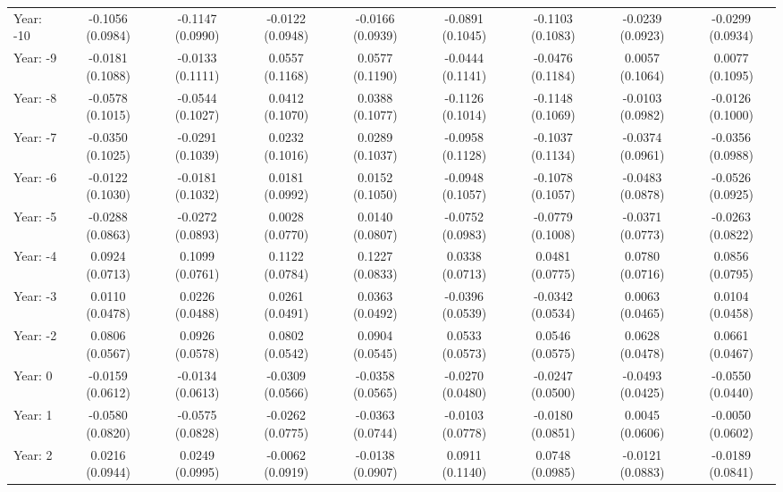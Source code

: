 \begin{tabular}{lcccccccc}
   Year: -10                           & -0.1056 (0.0984) & -0.1147 (0.0990) & -0.0122 (0.0948) & -0.0166 (0.0939) & -0.0891 (0.1045) & -0.1103 (0.1083) & -0.0239 (0.0923) & -0.0299 (0.0934)\\   
   Year: -9                            & -0.0181 (0.1088) & -0.0133 (0.1111) & 0.0557 (0.1168)  & 0.0577 (0.1190)  & -0.0444 (0.1141) & -0.0476 (0.1184) & 0.0057 (0.1064)  & 0.0077 (0.1095)\\   
   Year: -8                            & -0.0578 (0.1015) & -0.0544 (0.1027) & 0.0412 (0.1070)  & 0.0388 (0.1077)  & -0.1126 (0.1014) & -0.1148 (0.1069) & -0.0103 (0.0982) & -0.0126 (0.1000)\\   
   Year: -7                            & -0.0350 (0.1025) & -0.0291 (0.1039) & 0.0232 (0.1016)  & 0.0289 (0.1037)  & -0.0958 (0.1128) & -0.1037 (0.1134) & -0.0374 (0.0961) & -0.0356 (0.0988)\\   
   Year: -6                            & -0.0122 (0.1030) & -0.0181 (0.1032) & 0.0181 (0.0992)  & 0.0152 (0.1050)  & -0.0948 (0.1057) & -0.1078 (0.1057) & -0.0483 (0.0878) & -0.0526 (0.0925)\\   
   Year: -5                            & -0.0288 (0.0863) & -0.0272 (0.0893) & 0.0028 (0.0770)  & 0.0140 (0.0807)  & -0.0752 (0.0983) & -0.0779 (0.1008) & -0.0371 (0.0773) & -0.0263 (0.0822)\\   
   Year: -4                            & 0.0924 (0.0713)  & 0.1099 (0.0761)  & 0.1122 (0.0784)  & 0.1227 (0.0833)  & 0.0338 (0.0713)  & 0.0481 (0.0775)  & 0.0780 (0.0716)  & 0.0856 (0.0795)\\   
   Year: -3                            & 0.0110 (0.0478)  & 0.0226 (0.0488)  & 0.0261 (0.0491)  & 0.0363 (0.0492)  & -0.0396 (0.0539) & -0.0342 (0.0534) & 0.0063 (0.0465)  & 0.0104 (0.0458)\\   
   Year: -2                            & 0.0806 (0.0567)  & 0.0926 (0.0578)  & 0.0802 (0.0542)  & 0.0904 (0.0545)  & 0.0533 (0.0573)  & 0.0546 (0.0575)  & 0.0628 (0.0478)  & 0.0661 (0.0467)\\   
   Year: 0                             & -0.0159 (0.0612) & -0.0134 (0.0613) & -0.0309 (0.0566) & -0.0358 (0.0565) & -0.0270 (0.0480) & -0.0247 (0.0500) & -0.0493 (0.0425) & -0.0550 (0.0440)\\   
   Year: 1                             & -0.0580 (0.0820) & -0.0575 (0.0828) & -0.0262 (0.0775) & -0.0363 (0.0744) & -0.0103 (0.0778) & -0.0180 (0.0851) & 0.0045 (0.0606)  & -0.0050 (0.0602)\\   
   Year: 2                             & 0.0216 (0.0944)  & 0.0249 (0.0995)  & -0.0062 (0.0919) & -0.0138 (0.0907) & 0.0911 (0.1140)  & 0.0748 (0.0985)  & -0.0121 (0.0883) & -0.0189 (0.0841)\\   

\end{tabular}
